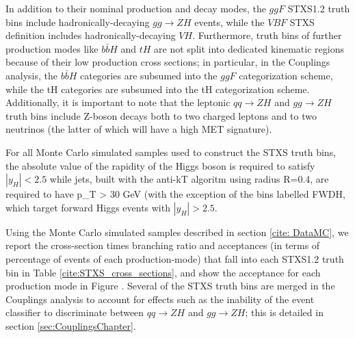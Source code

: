 In addition to their nominal production and decay modes, the $ggF$ STXS1.2 truth bins include hadronically-decaying $gg \rightarrow ZH$ events, while the $VBF$ STXS definition includes hadronically-decaying $VH$. Furthermore, truth bins of further production modes like $b\bar{b}H$ and $tH$ are not split into dedicated kinematic regions because of their low production cross sections; in particular, in the Couplings analysis, the $b\bar{b}H$ categories are subsumed into the $ggF$ categorization scheme, while the tH categories are subsumed into the tH categorization scheme. Additionally, it is important to note that the leptonic $qq \rightarrow ZH$ and $gg \rightarrow ZH$ truth bins include Z-boson decays both to two charged leptons and to two neutrinos (the latter of which will have a high MET signature). 

For all Monte Carlo simulated samples used to construct the STXS truth bins, the absolute value of the rapidity of the Higgs boson is required to satisfy $|y_{H}| < 2.5$ while jets, built with the anti-kT algoritm using radius R=0.4, are required to have p_{T} > 30 GeV (with the exception of the bins labelled FWDH, which target forward Higgs events with $|y_{H}| > 2.5$.

Using the Monte Carlo simulated samples described in section \ref{cite: DataMC}, we report the cross-section times branching ratio and acceptances (in terms of percentage of events of each production-mode) that fall into each STXS1.2 truth bin in Table \ref{cite:STXS_cross_sections}, and show the acceptance for each production mode in Figure . Several of the STXS truth bins are merged in the Couplings analysis to account for effects such as the inability of the event classifier to discriminate between $qq \rightarrow ZH$ and $gg \rightarrow ZH$; this is detailed in section \ref{sec:CouplingsChapter}.

